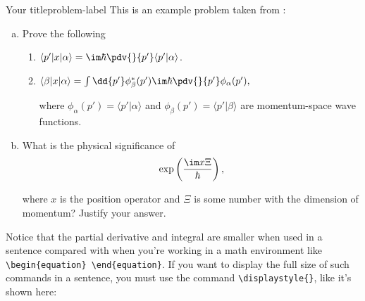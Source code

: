 

\newpage

\begin{problem}{Your title}{problem-label}
	This is an example problem taken from \cite{Sakurai2020}:
	
	\begin{enumerate}[(a)]
		\item Prove the following
		\begin{enumerate}[label = (\roman*)]
			\item $\langle p' | x | \alpha \rangle = \im \hbar \pdv{}{p'} \langle p' | \alpha \rangle$.
			
			\item $\langle \beta | x | \alpha \rangle = \int \dd{p'} \phi_{\beta}^{*} (p') \im \hbar \pdv{}{p'} \phi_{\alpha} (p'),$
			
			where $\phi_{\alpha}(p') = \langle p' | \alpha \rangle$ and $\phi_{\beta}(p') = \langle p' | \beta \rangle$ are momentum-space wave functions.
		\end{enumerate}
		
		\item What is the physical significance of 
		\[
		\exp\left(\dfrac{\im x \Xi}{\hbar}\right),
		\]
		
		where $x$ is the position operator and $\Xi$ is some number with the dimension of momentum? Justify your answer.
	\end{enumerate}
\end{problem}

Notice that the partial derivative and integral are smaller when used in a sentence compared with when you're working in a math environment like \verb|\begin{equation} \end{equation}|. If you want to display the full size of such commands in a sentence, you must use the command \verb|\displaystyle{}|, like it's shown here:


